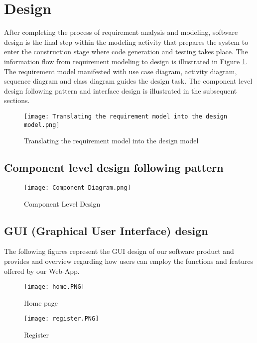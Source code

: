 \documentclass[11pt]{article} %
\begin{document}
\section{Design}
After completing the process of requirement analysis and modeling, software design is the final step within the modeling activity that prepares the system to enter the construction stage where code generation and testing takes place. The information flow from requirement modeling to design is illustrated in Figure \ref{fig:transleting diagram}. The requirement model manifested with use case diagram, activity diagram, sequence diagram and class diagram guides the design task. The component level design following pattern and interface design is illustrated in the subsequent sections.
	\begin{figure}[!hbt]
		\centering
        \texttt{[image: Translating the requirement model into the design model.png]} \par 
        \caption{Translating the requirement model into the design model}
        \label{fig:transleting diagram}
    \end{figure}
	\subsection{Component level design following pattern}
    
	\begin{figure}[!hbt]
		\centering
        \texttt{[image: Component Diagram.png]} \par 
        \caption{Component Level Design}
        \label{fig:Component Diagram}
    \end{figure}
    
	\subsection{GUI (Graphical User Interface) design}
	The following figures represent the GUI design of our software product and provides and overview regarding how users can employ the functions and features offered by our Web-App.
	\begin{figure}[!hbt]
		\centering
        \texttt{[image: home.PNG]} \par 
        \caption{Home page}
        \label{fig:home page}
    \end{figure}
    
    \begin{figure}[!hbt]
		\centering
        \texttt{[image: register.PNG]} \par 
        \caption{Register}
        \label{fig:register}
    \end{figure}
	
\end{document}
